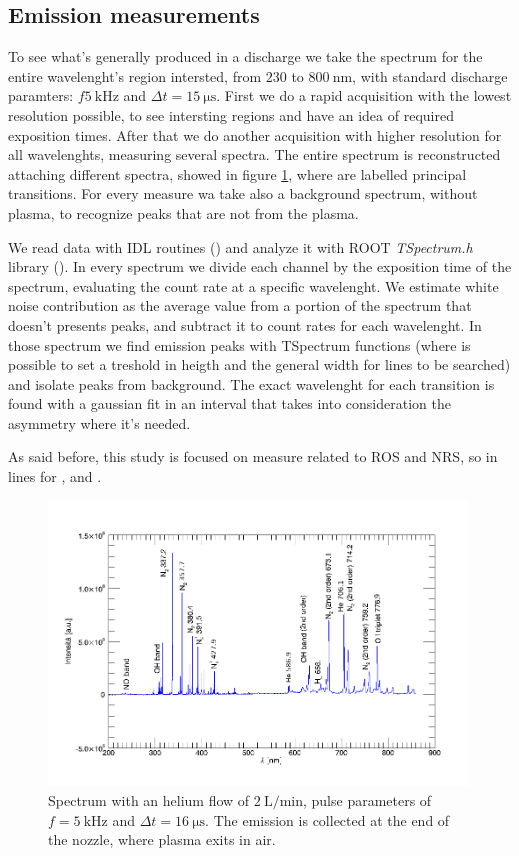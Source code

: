 \subsection{Emission measurements}
To see what's generally produced in a discharge we take the spectrum for the entire wavelenght's region intersted, from $\num{230}$ to $\SI{800}{\nano\meter}$, with standard discharge paramters: $f \SI{5}{\kilo\hertz}$ and $\Delta t = \SI{15}{\micro\second}$.
First we do a rapid acquisition with the lowest resolution possible, to see intersting regions and have an idea of required exposition times. After that we do another acquisition with higher resolution for all wavelenghts, measuring several spectra. The entire spectrum is reconstructed attaching different spectra, showed in figure \ref{fig:spectr}, where are labelled principal transitions.
For every measure wa take also a background spectrum, without plasma, to recognize peaks that are not from the plasma.

We read data with IDL routines (\cite{GUMLEY200215}) and analyze it with ROOT \emph{TSpectrum.h} library (\cite{ROOT:TSpectrum}).
In every spectrum we divide each channel by the exposition time of the spectrum, evaluating the count rate at a specific wavelenght.
We estimate white noise contribution as the average value from a portion of the spectrum that doesn't presents peaks, and subtract it to count rates for each wavelenght.
In those spectrum we find emission peaks with TSpectrum functions (where is possible to set a treshold in heigth and the general width for lines to be searched) and isolate peaks from background. The exact wavelenght for each transition is found with a gaussian fit in an interval that takes into consideration the asymmetry where it's needed.

As said before, this study is focused on measure related to ROS and NRS, so in lines for ,  and .
\begin{figure}
\centering
\includegraphics[width=0.99\textwidth]{Images/Spectroscopy/spettrotot_unico_label_def.png}
\caption{Spectrum with an helium flow of $\SI{2}{\liter/\minute}$, pulse parameters of $f = \SI{5}{\kilo\hertz}$ and $\Delta t = \SI{16}{\micro\second}$. The emission is collected at the end of the nozzle, where plasma exits in air.}
\label{fig:spectr}
\end{figure}


